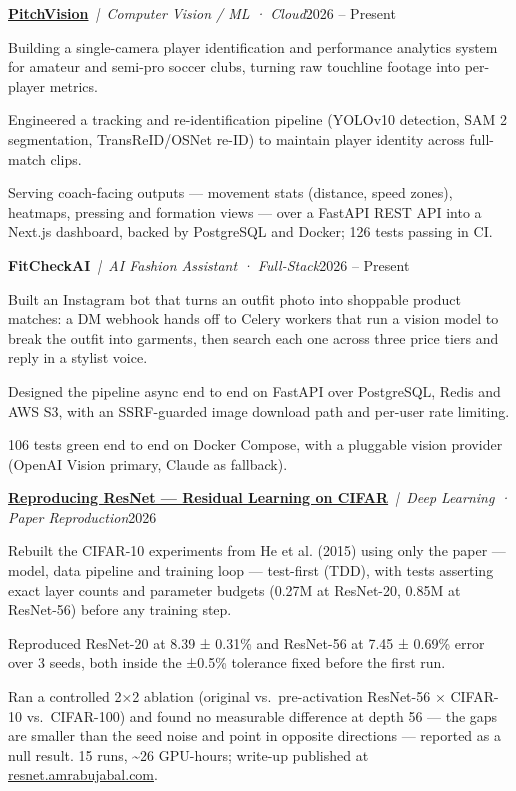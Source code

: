 \documentclass[10pt,letterpaper]{article}
\newcommand{\cvproject}[3]{%
  \vspace{4.5pt}%
  \textbf{#1}~\textit{|~#2}\hfill #3\par\vspace{1pt}%
}
\newenvironment{cvbullets}{%
  \begin{list}{\textbullet}{%
    \setlength{\leftmargin}{1.6em}%
    \setlength{\rightmargin}{0pt}%
    \setlength{\labelwidth}{1.1em}%
    \setlength{\labelsep}{0.5em}%
    \setlength{\itemindent}{0pt}%
    \setlength{\listparindent}{0pt}%
    \setlength{\topsep}{1pt}%
    \setlength{\partopsep}{0pt}%
    \setlength{\parsep}{0pt}%
    \setlength{\itemsep}{1.5pt}%
  }%
}{\end{list}}
\begin{document}
\cvproject{\href{https://github.com/AmroAbujabal/Pitch-Vision}{PitchVision}}{Computer Vision / ML · Cloud}{2026 -- Present}
\begin{cvbullets}
  \item Building a single-camera player identification and performance analytics system for amateur and
        semi-pro soccer clubs, turning raw touchline footage into per-player metrics.
  \item Engineered a tracking and re-identification pipeline (YOLOv10 detection, SAM 2 segmentation,
        TransReID/\allowbreak OSNet re-ID) to maintain player identity across full-match clips.
  \item Serving coach-facing outputs --- movement stats (distance, speed zones), heatmaps, pressing and
        formation views --- over a FastAPI REST API into a Next.js dashboard, backed by PostgreSQL and
        Docker; 126 tests passing in CI.
\end{cvbullets}

\cvproject{FitCheckAI}{AI Fashion Assistant · Full-Stack}{2026 -- Present}
\begin{cvbullets}
  \item Built an Instagram bot that turns an outfit photo into shoppable product matches: a DM webhook
        hands off to Celery workers that run a vision model to break the outfit into garments, then search
        each one across three price tiers and reply in a stylist voice.
  \item Designed the pipeline async end to end on FastAPI over PostgreSQL, Redis and AWS S3, with an
        SSRF-guarded image download path and per-user rate limiting.
  \item 106 tests green end to end on Docker Compose, with a pluggable vision provider (OpenAI Vision
        primary, Claude as fallback).
\end{cvbullets}

\cvproject{\href{https://github.com/AmroAbujabal/resnet-cifar-repro}{Reproducing ResNet --- Residual Learning on CIFAR}}{Deep Learning · Paper Reproduction}{2026}
\begin{cvbullets}
  \item Rebuilt the CIFAR-10 experiments from He et al. (2015) using only the paper --- model, data
        pipeline and training loop --- test-first (TDD), with tests asserting exact layer counts and
        parameter budgets (0.27M at ResNet-20, 0.85M at ResNet-56) before any training step.
  \item Reproduced ResNet-20 at 8.39 ± 0.31\% and ResNet-56 at 7.45 ± 0.69\% error over 3 seeds,
        both inside the ±0.5\% tolerance fixed before the first run.
  \item Ran a controlled 2×2 ablation (original vs.\ pre-activation ResNet-56 × CIFAR-10 vs.\
        CIFAR-100) and found no measurable difference at depth 56 --- the gaps are smaller than the seed
        noise and point in opposite directions --- reported as a null result. 15 runs, \textasciitilde26 GPU-hours;
        write-up published at \href{https://resnet.amrabujabal.com}{resnet.amrabujabal.com}.
\end{cvbullets}
\end{document}
